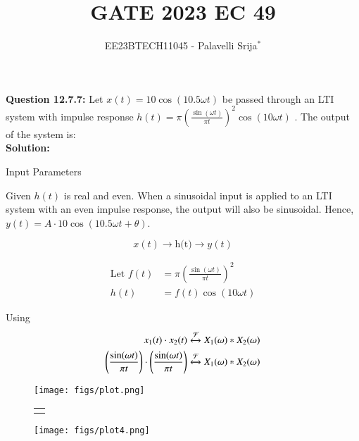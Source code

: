 \documentclass[journal,12pt,twocolumn]{IEEEtran}
\begin{document}
\title{GATE 2023 EC 49}
\author{EE23BTECH11045 - Palavelli Srija$^{*}$}
\maketitle

\bigskip

\textbf{Question 12.7.7:} 
Let $x(t) = 10 \cos(10.5 \omega t)$ be passed through an LTI system with impulse response $h(t) = \pi\left(\frac{\sin(\omega t)}{\pi t}\right)^2 \cos(10 \omega t)$ . The output of the system is: \\

\textbf{Solution:}
\begin{table}[h!]
    \centering
    
    \caption{Input Parameters}
    \label{tab:table_sr10}
\end{table}

Given \(h(t)\) is real and even. When a sinusoidal input is applied to an LTI system with an even impulse response, the output will also be sinusoidal. Hence, \(y(t) = A\cdot 10\cos(10.5 \omega t + \theta)\).

\[
x(t) \xrightarrow{\text{}} \boxed{\text{h(t)}} \xrightarrow{\text{}} y(t)
\]

\begin{align}
\text{Let } f(t) &= \pi\left(\frac{\sin(\omega t)}{\pi t}\right)^2 \\
h(t) &= f(t) \cos(10 \omega t)
\end{align}

Using 
\begin{align}
x_1(t) \cdot x_2(t) \xleftrightarrow{\mathcal{F}} X_1(\omega) * X_2(\omega)\\
\left(\frac{\sin(\omega t)}{\pi t}\right) \cdot \left(\frac{\sin(\omega t)}{\pi t}\right) \xleftrightarrow{\mathcal{F}} X_1(\omega) * X_2(\omega)
\end{align}
\begin{figure}[h!]
    \centering
    \texttt{[image: figs/plot.png]}\hfill
    \begin{tabular}{c}
        {\sffamily\raisebox{1.75cm}{*}} 
    \end{tabular}\hfill
    \texttt{[image: figs/plot4.png]}
    
    \caption{}
    \label{fig:overall}
\end{figure}
\end{document}
